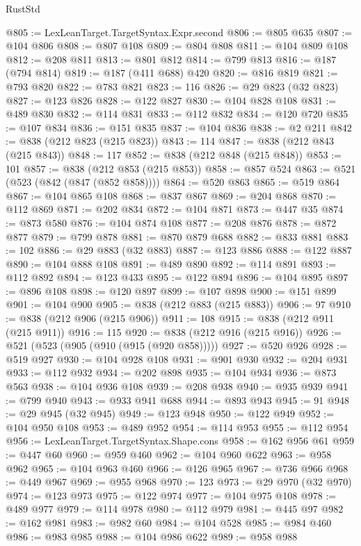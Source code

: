 \begin{lexlean}{RustStd}
\begin{coremodule}
@805 := LexLeanTarget.TargetSyntax.Expr.second
@806 := @805 @635
@807 := @104 @806
@808 := @807 @108
@809 := @804 @808
@811 := @104 @809 @108
@812 := @208 @811
@813 := @801 @812
@814 := @799 @813
@816 := @187 (@794 @814)
@819 := @187 (@411 @688) @420
@820 := @816 @819
@821 := @793 @820
@822 := @783 @821
@823 := 116
@826 := @29 @823 (@32 @823)
@827 := @123 @826
@828 := @122 @827
@830 := @104 @828 @108
@831 := @489 @830
@832 := @114 @831
@833 := @112 @832
@834 := @120 @720
@835 := @107 @834
@836 := @151 @835
@837 := @104 @836
@838 := @2 @211
@842 := @838 (@212 @823 (@215 @823))
@843 := 114
@847 := @838 (@212 @843 (@215 @843))
@848 := 117
@852 := @838 (@212 @848 (@215 @848))
@853 := 101
@857 := @838 (@212 @853 (@215 @853))
@858 := @857 @524
@863 := @521 (@523 (@842 (@847 (@852 @858))))
@864 := @520 @863
@865 := @519 @864
@867 := @104 @865 @108
@868 := @837 @867
@869 := @204 @868
@870 := @112 @869
@871 := @202 @834
@872 := @104 @871
@873 := @447 @35
@874 := @873 @580
@876 := @104 @874 @108
@877 := @208 @876
@878 := @872 @877
@879 := @799 @878
@881 := @870 @879 @688
@882 := @833 @881
@883 := 102
@886 := @29 @883 (@32 @883)
@887 := @123 @886
@888 := @122 @887
@890 := @104 @888 @108
@891 := @489 @890
@892 := @114 @891
@893 := @112 @892
@894 := @123 @433
@895 := @122 @894
@896 := @104 @895
@897 := @896 @108
@898 := @120 @897
@899 := @107 @898
@900 := @151 @899
@901 := @104 @900
@905 := @838 (@212 @883 (@215 @883))
@906 := 97
@910 := @838 (@212 @906 (@215 @906))
@911 := 108
@915 := @838 (@212 @911 (@215 @911))
@916 := 115
@920 := @838 (@212 @916 (@215 @916))
@926 := @521 (@523 (@905 (@910 (@915 (@920 @858)))))
@927 := @520 @926
@928 := @519 @927
@930 := @104 @928 @108
@931 := @901 @930
@932 := @204 @931
@933 := @112 @932
@934 := @202 @898
@935 := @104 @934
@936 := @873 @563
@938 := @104 @936 @108
@939 := @208 @938
@940 := @935 @939
@941 := @799 @940
@943 := @933 @941 @688
@944 := @893 @943
@945 := 91
@948 := @29 @945 (@32 @945)
@949 := @123 @948
@950 := @122 @949
@952 := @104 @950 @108
@953 := @489 @952
@954 := @114 @953
@955 := @112 @954
@956 := LexLeanTarget.TargetSyntax.Shape.cons
@958 := @162 @956 @61
@959 := @447 @60
@960 := @959 @460
@962 := @104 @960 @622
@963 := @958 @962
@965 := @104 @963 @460
@966 := @126 @965
@967 := @736 @966
@968 := @449 @967
@969 := @955 @968
@970 := 123
@973 := @29 @970 (@32 @970)
@974 := @123 @973
@975 := @122 @974
@977 := @104 @975 @108
@978 := @489 @977
@979 := @114 @978
@980 := @112 @979
@981 := @445 @97
@982 := @162 @981
@983 := @982 @60
@984 := @104 @528
@985 := @984 @460
@986 := @983 @985
@988 := @104 @986 @622
@989 := @958 @988

\end{coremodule}
\end{lexlean}
